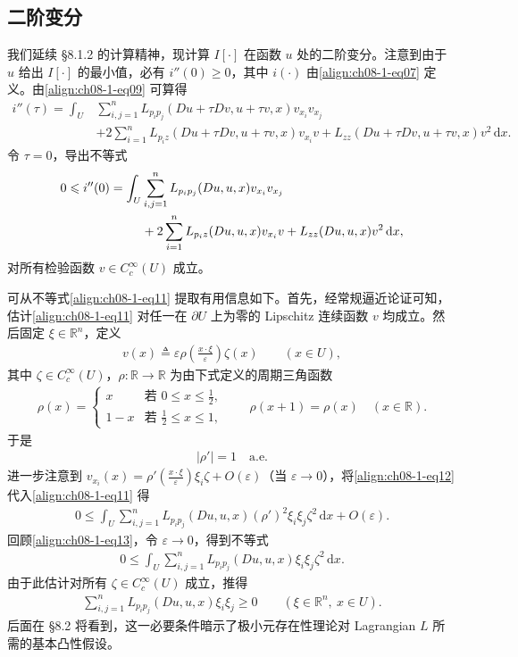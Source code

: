 \documentclass[../../main.tex]{subfiles}
\begin{document}
\subsection{二阶变分}\label{subsection:ch08-1-3-二阶变分}

我们延续 \S8.1.2 的计算精神，现计算 $I[\cdot]$ 在函数 $u$ 处的二阶变分。注意到由于 $u$ 给出 $I[\cdot]$ 的最小值，必有 $i''(0)\geqslant 0$，其中 $i(\cdot)$ 由\eqref{align:ch08-1-eq07} 定义。由\eqref{align:ch08-1-eq09} 可算得
\begin{align*}
i''(\tau)=\int_U&\sum_{i,j=1}^n L_{p_ip_j}(Du+\tau Dv,u+\tau v,x)v_{x_i}v_{x_j}\\
&+2\sum_{i=1}^n L_{p_iz}(Du+\tau Dv,u+\tau v,x)v_{x_i}v+L_{zz}(Du+\tau Dv,u+\tau v,x)v^2\,\mathrm{d}x.
\end{align*}
令 $\tau=0$，导出不等式
\begin{align}
0\leqslant i''(0)=\int_U&\sum_{i,j=1}^n L_{p_ip_j}(Du,u,x)v_{x_i}v_{x_j}\notag\\
&+2\sum_{i=1}^n L_{p_iz}(Du,u,x)v_{x_i}v+L_{zz}(Du,u,x)v^2\,\mathrm{d}x,\label{align:ch08-1-eq11}
\end{align}
对所有检验函数 $v\in C_c^\infty(U)$ 成立。

可从不等式\eqref{align:ch08-1-eq11} 提取有用信息如下。首先，经常规逼近论证可知，估计\eqref{align:ch08-1-eq11} 对任一在 $\partial U$ 上为零的 Lipschitz 连续函数 $v$ 均成立。然后固定 $\xi\in\mathbb{R}^n$，定义
\begin{align}
v(x)\triangleq\varepsilon\rho\!\left(\frac{x\cdot\xi}{\varepsilon}\right)\zeta(x)\qquad (x\in U),\label{align:ch08-1-eq12}
\end{align}
其中 $\zeta\in C_c^\infty(U)$，$\rho:\mathbb{R}\to\mathbb{R}$ 为由下式定义的周期三角函数
\begin{align*}
\rho(x)=\begin{cases}x&\text{若 }0\leqslant x\leqslant\frac12,\\1-x&\text{若 }\frac12\leqslant x\leqslant 1,\end{cases}\qquad \rho(x+1)=\rho(x)\quad (x\in\mathbb{R}).
\end{align*}
于是
\begin{align}
|\rho'|=1\quad\text{a.e.}\label{align:ch08-1-eq13}
\end{align}
进一步注意到 $v_{x_i}(x)=\rho'\!\left(\frac{x\cdot\xi}{\varepsilon}\right)\xi_i\zeta+O(\varepsilon)$（当 $\varepsilon\to 0$），将\eqref{align:ch08-1-eq12} 代入\eqref{align:ch08-1-eq11} 得
\begin{align*}
0\leqslant\int_U\sum_{i,j=1}^n L_{p_ip_j}(Du,u,x)(\rho')^2\xi_i\xi_j\zeta^2\,\mathrm{d}x+O(\varepsilon).
\end{align*}
回顾\eqref{align:ch08-1-eq13}，令 $\varepsilon\to 0$，得到不等式
\begin{align*}
0\leqslant\int_U\sum_{i,j=1}^n L_{p_ip_j}(Du,u,x)\xi_i\xi_j\zeta^2\,\mathrm{d}x.
\end{align*}
由于此估计对所有 $\zeta\in C_c^\infty(U)$ 成立，推得
\begin{align}
\sum_{i,j=1}^n L_{p_ip_j}(Du,u,x)\xi_i\xi_j\geqslant 0\qquad (\xi\in\mathbb{R}^n,\ x\in U).\label{align:ch08-1-eq14}
\end{align}
后面在 \S8.2 将看到，这一必要条件暗示了极小元存在性理论对 Lagrangian $L$ 所需的基本凸性假设。
\end{document}
